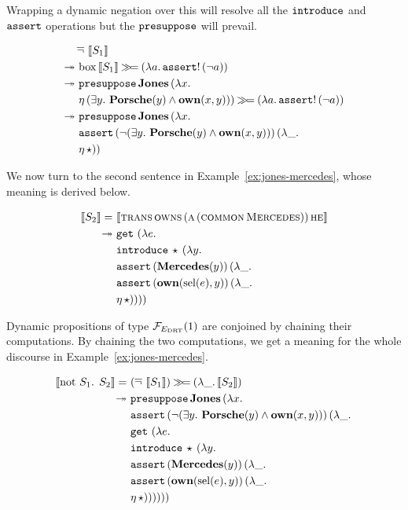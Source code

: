 Wrapping a dynamic negation over this will resolve all the $\mathtt{introduce}$
and $\mathtt{assert}$ operations but the $\mathtt{presuppose}$ will prevail.

\begin{align*}
&\mathop{\overline{\lnot}}\ \llbracket S_1 \rrbracket \\
\twoheadrightarrow &\ \mathrm{box}\,\llbracket S_1 \rrbracket \mathbin{\gg\!=} (\lambda a.\, \mathtt{assert}!\,(\lnot a))\\
\twoheadrightarrow &\ \mathtt{presuppose}\,\textbf{Jones}\,(\lambda x.\,  \\
     &\ \eta\,(\exists y.\ \textbf{Porsche}(y) \land \textbf{own}(x, y))) \mathbin{\gg\!=} (\lambda a.\, \mathtt{assert}!\,(\lnot a)) \\
\twoheadrightarrow &\ \mathtt{presuppose}\,\textbf{Jones}\,(\lambda x.\,  \\
     &\ \mathtt{assert}\,(\lnot (\exists y.\ \textbf{Porsche}(y) \land \textbf{own}(x, y)))\,(\lambda \_.\,  \\
     &\ \eta\,\star))
\end{align*}

We now turn to the second sentence in Example~\ref{ex:jones-mercedes},
whose meaning is derived below.

\begin{align*}
  \sem{S_2} =
     &\ \sem{\appp{\abs{trans}}{\abs{owns}}{(\ap{\abs{a}}{(\ap{\abs{common}}{\abs{Mercedes}})})}{\abs{he}}} \\
\tto &\ \app{\op{get}}{}{(\lam{e}{ \\
     &\ \app{\op{introduce}}{\star}{(\lam{y}{ \\
     &\ \app{\op{assert}}{(\obj{Mercedes}(y))}{(\lam{\_}{ \\
     &\ \app{\op{assert}}{(\obj{own}(\sel(e), y))}{(\lam{\_}{ \\
     &\ \etaE{\star}})}})}})}})}
\end{align*}

Dynamic propositions of type $\mathcal{F}_{E_{\mathrm{DRT}}}(1)$ are conjoined by chaining
their computations. By chaining the two computations, we get a meaning for
the whole discourse in Example~\ref{ex:jones-mercedes}.

\begin{align*}
  \llbracket \text{not $S_1$. $S_2$} \rrbracket = &\ (\mathop{\overline{\lnot}}\ \llbracket S_1 \rrbracket) \mathbin{\gg\!=} (\lambda \_.\, \llbracket S_2 \rrbracket) \\
\twoheadrightarrow &\ \mathtt{presuppose}\,\textbf{Jones}\,(\lambda x.\,  \\
     &\ \mathtt{assert}\,(\lnot (\exists y.\ \textbf{Porsche}(y) \land \textbf{own}(x, y)))\,(\lambda \_.\,  \\
     &\ \mathtt{get}\,\,(\lambda e.\,  \\
     &\ \mathtt{introduce}\,\star\,(\lambda y.\,  \\
     &\ \mathtt{assert}\,(\textbf{Mercedes}(y))\,(\lambda \_.\,  \\
     &\ \mathtt{assert}\,(\textbf{own}(\operatorname{sel}(e), y))\,(\lambda \_.\,  \\
     &\ \eta\,\star))))))
\end{align*}

